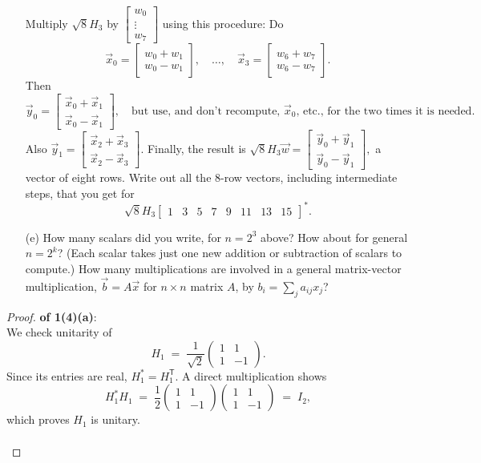 \documentclass[lang=cn,11pt]{elegantbook}
\begin{document}
\begin{itemize}
\noindent
Multiply $\sqrt{8} H_3$ by \(
\begin{bmatrix}
w_0 \\ 
\vdots \\ 
w_7
\end{bmatrix}
\) using this procedure: Do
\[
\vec{x}_0 = 
\begin{bmatrix}
w_0 + w_1 \\
w_0 - w_1
\end{bmatrix}, \quad \dots, \quad 
\vec{x}_3 = 
\begin{bmatrix}
w_6 + w_7 \\
w_6 - w_7
\end{bmatrix}.
\]
Then \(
\vec{y}_0 = 
\begin{bmatrix}
\vec{x}_0 + \vec{x}_1 \\
\vec{x}_0 - \vec{x}_1
\end{bmatrix}, \quad \text{but use, and don't recompute, $\vec{x}_0$, etc., for the two times it is needed.}
\)
Also  \(
\vec{y}_1 = 
\begin{bmatrix}
\vec{x}_2 + \vec{x}_3 \\
\vec{x}_2 - \vec{x}_3
\end{bmatrix}.
\) Finally, the result is \(
\sqrt{8} H_3 \vec{w} = 
\begin{bmatrix}
\vec{y}_0 + \vec{y}_1 \\
\vec{y}_0 - \vec{y}_1
\end{bmatrix},
\)
a vector of eight rows. Write out all the 8-row vectors, including intermediate steps, that you get for 
\[
\sqrt{8} H_3
\begin{bmatrix}
1 & 3 & 5 & 7 & 9 & 11 & 13 & 15
\end{bmatrix}^*.
\]

\item[(e)] How many scalars did you write, for $n = 2^3$ above? How about for general $n = 2^k$? (Each scalar takes just one new addition or subtraction of scalars to compute.) How many multiplications are involved in a general matrix-vector multiplication, $\vec{b} = A \vec{x}$ for $n \times n$ matrix $A$, by $b_i = \sum_j a_{ij} x_j$?
\end{itemize}

\begin{proof}
    \textbf{of 1(4)(a)}:\\
We check unitarity of
\[
  H_1 \;=\;\frac{1}{\sqrt{2}}
  \begin{pmatrix}
    1 & 1\\
    1 & -1
  \end{pmatrix}.
\]
Since its entries are real, \(H_1^* = H_1^\mathsf{T}\). A direct multiplication shows
\[
  H_1^* H_1
  \;=\;\frac{1}{2}
  \begin{pmatrix}1 & 1\\ 1 & -1\end{pmatrix}
  \begin{pmatrix}1 & 1\\ 1 & -1\end{pmatrix}
  \;=\;I_2,
\]
which proves \(H_1\) is unitary.\\\\
\end{proof}
\end{document}
